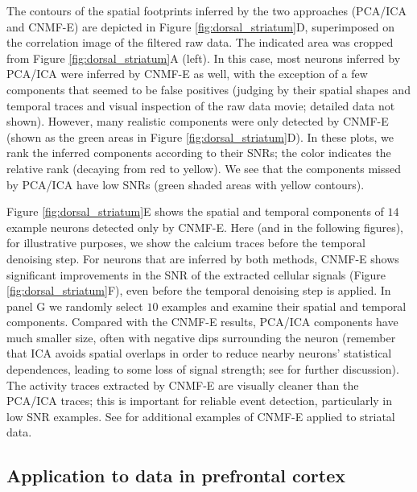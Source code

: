 \documentclass[9pt,lineno]{elife}
\begin{document}
The contours of the spatial footprints inferred by the two approaches (PCA/ICA and CNMF-E) are depicted in Figure \ref{fig:dorsal_striatum}D, superimposed on the correlation image of the filtered raw data. The indicated area was cropped from Figure \ref{fig:dorsal_striatum}A (left). 
In this case, most neurons inferred by PCA/ICA were inferred by CNMF-E as well, with the exception of a few components that seemed to be false positives (judging by their spatial shapes and temporal traces and visual inspection of the raw data movie; detailed data not shown).  However, many realistic components were only detected by CNMF-E (shown as the green areas in Figure \ref{fig:dorsal_striatum}D). In these plots, we rank the inferred components according to their SNRs; the color indicates the relative rank (decaying from red to yellow). We see that the components missed by PCA/ICA have low SNRs (green shaded areas with yellow contours). 

Figure \ref{fig:dorsal_striatum}E shows the spatial and temporal components of $14$ example neurons detected only by CNMF-E. Here (and in the following figures), for illustrative purposes, we show the calcium traces before the temporal denoising step. 
For neurons that are inferred by both methods, CNMF-E shows significant improvements in the SNR of the extracted cellular signals (Figure \ref{fig:dorsal_striatum}F), even before the temporal denoising step is applied.  In panel G we randomly select $10$ examples and examine their spatial and temporal components. Compared with the CNMF-E results, PCA/ICA components have much smaller size, often with negative dips surrounding the neuron (remember that ICA avoids spatial overlaps in order to reduce nearby neurons' statistical dependences, leading to some loss of signal strength; see \citep{Pnevmatikakis2016} for further discussion). The activity traces extracted  by CNMF-E are visually cleaner than the PCA/ICA traces; this is important for reliable event detection, particularly in low SNR examples. See \citep{Klaus2017} for additional examples of  CNMF-E applied to striatal data.

\subsection{Application to data in prefrontal cortex}
\end{document}
